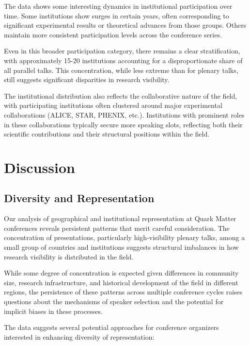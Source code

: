 \documentclass[a4paper,11pt]{article}
\begin{document}
The data shows some interesting dynamics in institutional participation over time. Some institutions show surges in certain years, often corresponding to significant experimental results or theoretical advances from those groups. Others maintain more consistent participation levels across the conference series.

Even in this broader participation category, there remains a clear stratification, with approximately 15-20 institutions accounting for a disproportionate share of all parallel talks. This concentration, while less extreme than for plenary talks, still suggests significant disparities in research visibility.

The institutional distribution also reflects the collaborative nature of the field, with participating institutions often clustered around major experimental collaborations (ALICE, STAR, PHENIX, etc.). Institutions with prominent roles in these collaborations typically secure more speaking slots, reflecting both their scientific contributions and their structural positions within the field.

\section{Discussion}

\subsection{Diversity and Representation}

Our analysis of geographical and institutional representation at Quark Matter conferences reveals persistent patterns that merit careful consideration. The concentration of presentations, particularly high-visibility plenary talks, among a small group of countries and institutions suggests structural imbalances in how research visibility is distributed in the field.

While some degree of concentration is expected given differences in community size, research infrastructure, and historical development of the field in different regions, the persistence of these patterns across multiple conference cycles raises questions about the mechanisms of speaker selection and the potential for implicit biases in these processes.

The data suggests several potential approaches for conference organizers interested in enhancing diversity of representation:
\end{document}
